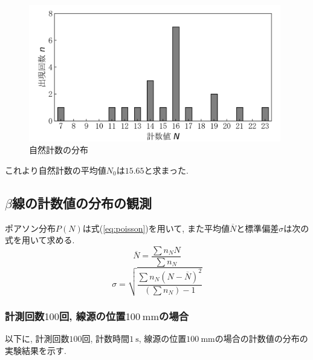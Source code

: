 \documentclass{jarticle}
\begin{document}
\begin{figure}[H]
  \begin{center}
    \includegraphics[width=110mm]{graph/count-distribution-100mm-20times.png}
    \caption{自然計数の分布}
    \label{fg:natural-count-distribution}
  \end{center}
\end{figure}

これより自然計数の平均値$N_0$は$15.65$と求まった.


\subsection{$\beta$線の計数値の分布の観測}

ポアソン分布$P(N)$は式(\ref{eq:poisson})を用いて, また平均値$\overline{N}$と標準偏差$\sigma$は次の式を用いて求める.
\begin{equation}
  \overline{N} = \frac{\sum n_N N}{\sum n_N}
\end{equation}
\begin{equation}
  \sigma = \sqrt{\frac{\sum n_N (N-\overline{N})^2}{(\sum n_N) - 1}}
\end{equation}


\subsubsection{計測回数$100$回, 線源の位置$100\ \mathrm{mm}$の場合}

以下に, 計測回数$100$回, 計数時間$1\ \mathrm{s}$, 線源の位置$100\ \mathrm{mm}$の場合の計数値の分布の実験結果を示す.
\end{document}
